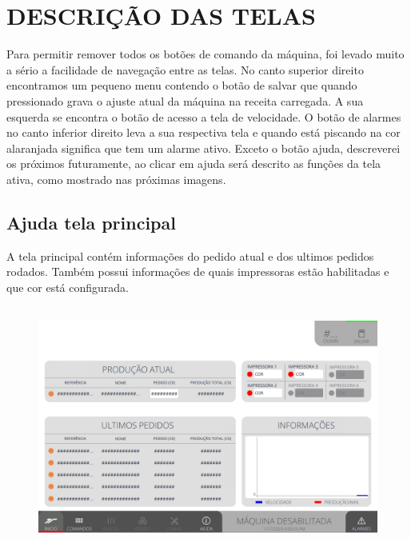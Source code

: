 \thispagestyle{fancy}

\vspace*{\fill}

\section{\MakeUppercase{\large{Descrição das telas}}}

Para permitir remover todos os botões de comando da máquina, foi levado muito a sério a facilidade de navegação entre as telas.
No canto superior direito encontramos um pequeno menu contendo o botão de salvar que quando pressionado grava o ajuste atual da máquina na receita carregada. A sua esquerda se encontra o botão de acesso a tela de velocidade. O botão de alarmes no canto inferior direito leva a sua respectiva tela e quando está piscando na cor alaranjada significa que tem um alarme ativo. Exceto o botão ajuda, descreverei os próximos futuramente, ao clicar em ajuda será descrito as funções da tela ativa, como mostrado nas próximas imagens.

\subsection{Ajuda tela principal}

A tela principal contém informações do pedido atual e dos ultimos pedidos rodados. Também
possui informações de quais impressoras estão habilitadas e que cor está configurada.

\begin{figure}[h]
  \centering
  \includegraphics[width=480px,height=300px]{src/imagesFlexo/01-main/e-Tela-Principal.png}
   \label{}
\end{figure}

\newpage
\thispagestyle{fancy}

